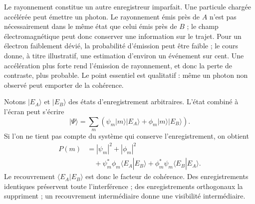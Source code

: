 Le rayonnement constitue un autre enregistreur imparfait. Une particule chargée accélérée peut émettre un photon. Le rayonnement émis près de \(A\) n’est pas nécessairement dans le même état que celui émis près de \(B\) ; le champ électromagnétique peut donc conserver une information sur le trajet. Pour un électron faiblement dévié, la probabilité d’émission peut être faible ; le cours donne, à titre illustratif, une estimation d’environ un événement sur cent. Une accélération plus forte rend l’émission de rayonnement, et donc la perte de contraste, plus probable. Le point essentiel est qualitatif : même un photon non observé peut emporter de la cohérence.

\begin{classroomqa}
\end{classroomqa}

\begin{classroomqa}
\end{classroomqa}

Notons \(|E_A\rangle\) et \(|E_B\rangle\) des états d’enregistrement arbitraires. L’état combiné à l’écran peut s’écrire
\begin{equation}
|\Psi\rangle
=\sum_m\left(
\psi_m|m\rangle|E_A\rangle
+\phi_m|m\rangle|E_B\rangle
\right).
\end{equation}
Si l’on ne tient pas compte du système qui conserve l’enregistrement, on obtient
\begin{align}
P(m)
&=|\psi_m|^2+|\phi_m|^2 \\
&\quad
+\psi_m^*\phi_m\langle E_A|E_B\rangle
+\phi_m^*\psi_m\langle E_B|E_A\rangle.
\end{align}
Le recouvrement \(\langle E_A|E_B\rangle\) est donc le facteur de cohérence. Des enregistrements identiques préservent toute l’interférence ; des enregistrements orthogonaux la suppriment ; un recouvrement intermédiaire donne une visibilité intermédiaire.

